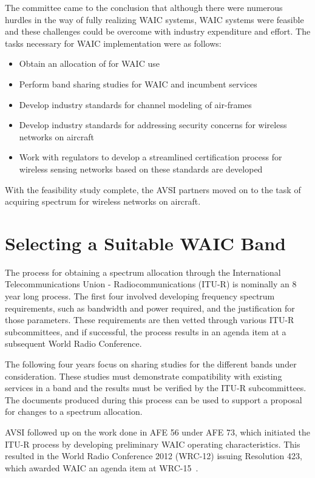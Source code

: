 The committee came to the conclusion that although there were numerous hurdles in the way of fully realizing WAIC systems, WAIC systems were feasible and these challenges could be overcome with industry expenditure and effort. The tasks necessary for WAIC implementation were as follows: 
\begin{itemize}
\item Obtain an allocation of for WAIC use
\item Perform band sharing studies for WAIC and incumbent services
\item Develop industry standards for channel modeling of air-frames
\item Develop industry standards for addressing security concerns for wireless networks on aircraft
\item Work with regulators to develop a streamlined certification process for wireless sensing networks based on these standards are developed
\end{itemize}
 
With the feasibility study complete, the AVSI partners moved on to the task of acquiring spectrum for wireless networks on aircraft. 
 
\section{Selecting a Suitable WAIC Band}
The process for obtaining a spectrum allocation through the International Telecommunications Union - Radiocommunications (ITU-R) is nominally an 8 year long process. The first four involved developing frequency spectrum requirements, such as bandwidth and power required, and the justification for those parameters. These requirements are then vetted through various ITU-R subcommittees, and if successful, the process results in an agenda item at a subsequent World Radio Conference.  

The following four years focus on sharing studies for the different bands under consideration. These studies must demonstrate compatibility with existing services in a band and the results must be verified by the ITU-R subcommittees. The documents produced during this process can be used to support a proposal for changes to a spectrum allocation. 

AVSI followed up on the work done in AFE 56 under AFE 73, which initiated the ITU-R process by developing preliminary WAIC operating characteristics. This resulted in the World Radio Conference 2012 (WRC-12) issuing Resolution 423, which awarded WAIC an agenda item at WRC-15~\cite{noauthor_consideration_2012}.

